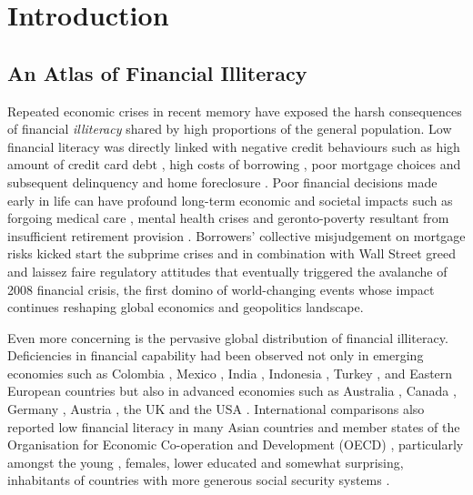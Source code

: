 \documentclass[a4paper,11pt,UKenglish,twoside,openright]{report}\usepackage[]{graphicx}\usepackage[]{color}
\begin{document}
\chapter{Introduction}
\label{chp:1}



\section{An Atlas of Financial Illiteracy}

Repeated economic crises in recent memory have exposed the harsh consequences of financial \emph{illiteracy} shared by high proportions of the general population. Low financial literacy was directly linked with negative credit behaviours such as high amount of credit card debt \parencite{norvilitis:2010}, high costs of borrowing \parencite{huston:2012, pak:2018}, poor mortgage choices \parencite{cox:2015} and subsequent delinquency and home foreclosure \parencite{agarwal:2015a, gerardi:2010}. Poor financial decisions made early in life can have profound long-term economic and societal impacts \parencite{montoya:2013} such as forgoing medical care \parencite{lusardi:2015}, mental health crises \parencite{stone:2018} and geronto-poverty resultant from insufficient retirement provision \parencite{lusardi:2007, lusardi:2008}. Borrowers' collective misjudgement on mortgage risks kicked start the subprime crises and in combination with Wall Street greed and laissez faire regulatory attitudes that eventually triggered the avalanche of 2008 financial crisis, the first domino of world-changing events whose impact continues reshaping global economics and geopolitics landscape.

Even more concerning is the pervasive global distribution of financial illiteracy. Deficiencies in financial capability had been observed not only in emerging economies \parencite{karakurumozdemir:2019} such as Colombia \parencite{caoalvira:2020}, Mexico \parencite{arceogomez:2017, bohm:2021}, India \parencite{agarwal:2015b, kiliyanni:2016, utkarsh:2020}, Indonesia \parencite{cole:2009, khoirunnisaa:2020}, Turkey \parencite{akbenselcuk:2014}, and Eastern European countries \parencite{belas:2016, opletalova:2015, reiter:2020} but also in advanced economies such as Australia \parencite{ali:2014, taylor:2013, thomson:2017}, Canada \parencite{boisclair:2017}, Germany \parencite{bucherkoenen:2017, erner:2016}, Austria \parencite{silgoner:2015}, the UK \parencite{barnard:2021} and the USA \parencite{breitbach:2016, gale:2012, lusardi:2010}. International comparisons also reported low financial literacy in many Asian countries \parencite{yoshino:2015} and member states of the Organisation for Economic Co-operation and Development (OECD) \parencite{cupak:2018a, lusardi:2015a}, particularly amongst the young \parencite{debeckker:2019}, females, lower educated \parencite{klapper:2019} and somewhat surprising, inhabitants of countries with more generous social security systems \parencite{jappelli:2010}.
\end{document}
